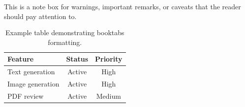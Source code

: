 \begin{notebox}
  This is a note box for warnings, important remarks, or caveats that
  the reader should pay attention to.
\end{notebox}

\begin{table}[htbp]
  \centering
  \begin{tabular}{lcc}
    \toprule
    Feature & Status & Priority \\
    \midrule
    Text generation & Active & High \\
    Image generation & Active & High \\
    PDF review & Active & Medium \\
    \bottomrule
  \end{tabular}
  \caption{Example table demonstrating booktabs formatting.}
  \label{tab:example}
\end{table}

